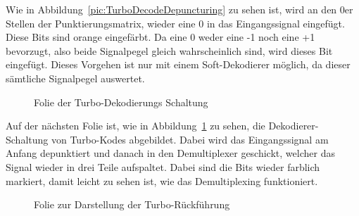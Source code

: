 Wie in Abbildung~\ref{pic:TurboDecodeDepuncturing} zu sehen ist, wird an den 0er Stellen der Punktierungsmatrix, wieder eine 0 in das Eingangssignal eingefügt. Diese Bits sind orange eingefärbt. Da eine 0 weder eine -1 noch eine +1 bevorzugt, also beide Signalpegel gleich wahrscheinlich sind, wird dieses Bit eingefügt. Dieses Vorgehen ist nur mit einem Soft-Dekodierer möglich, da dieser sämtliche Signalpegel auswertet. 

\begin{figure}[th]
\centering
{}
\caption{Folie der Turbo-Dekodierungs Schaltung}
\label{pic:TurboDecode}
\end{figure}

Auf der nächsten Folie ist, wie in Abbildung~\ref{pic:TurboDecode} zu sehen, die Dekodierer-Schaltung von Turbo-Kodes abgebildet. Dabei wird das Eingangssignal am Anfang depunktiert und danach in den Demultiplexer geschickt, welcher das Signal wieder in drei Teile aufspaltet. Dabei sind die Bits wieder farblich markiert, damit leicht zu sehen ist, wie das Demultiplexing funktioniert.

\begin{figure}[th]
\centering
{}
\caption{Folie zur Darstellung der Turbo-Rückführung}
\label{pic:TurboDecodeBack}
\end{figure}

